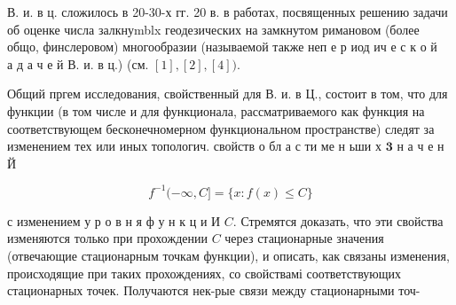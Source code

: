 \documentclass[10pt]{article}
\begin{document}
В. и. в ц. сложилось в 20-30-х гг. 20 в. в работах, посвященных решению задачи об оценке числа залкнуmblx геодезических на замкнутом римановом (более общо, финслеровом) многообразии (называемой также неп е р иод ич е с к о й $\quad$ а д а ч е й В. и. в ц.) (см. $[1],[2],[4])$.



Общий пргем исследования, свойственный для В. и. в Ц., состоит в том, что для функции (в том числе и для функционала, рассматриваемого как функция на соответствующем бесконечномерном функциональном пространстве) следят за изменением тех или иных топологич. свойств о бл а с ти ме н ьши х $\mathbf{3}$ н а ч е н Й



\[

f^{-1}(-\infty, C]=\{x: f(x) \leqslant C\}

\]



с изменением у р о в н я ф у н к ц и И $C$. Стремятся доказать, что эти свойства изменяются только при прохождении $C$ через стационарные значения (отвечающие стационарным точкам функции), и описать, как связаны изменения, происходящие при таких прохождениях, со свойствамі соответствующих стационарных точек. Получаются нек-рые связи между стационарными точ-
\end{document}
